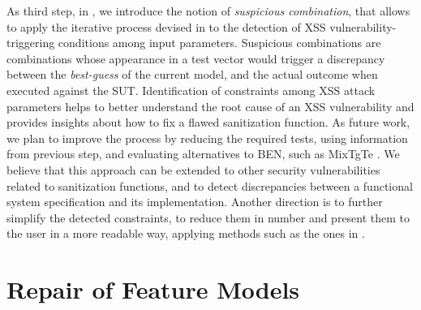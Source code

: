 \begin{tikzborder}{\cite{Gargantini16:validation}}
\begin{tikzborder}{\cite{gargantini_combinatorial_2017}}
\begin{tikzborder}{\cite{gargantini_combinatorial_2017}}
\begin{tikzborder}{\cite{garn2019}}
As third step, in \cite{garn2019}, we introduce the notion of \textit{suspicious combination}, that allows to apply the iterative process devised in \cite{gargantini_combinatorial_2017} to the detection of XSS vulnerability-triggering conditions among input parameters.
Suspicious combinations are combinations whose appearance in a test vector would trigger a discrepancy between the \textit{best-guess} of the current model, and the actual outcome when executed against the SUT.
Identification of constraints among XSS attack parameters helps to better understand
the root cause of an XSS vulnerability and provides insights about how to fix
a flawed sanitization function.
As future work, we plan to improve the process by reducing the required tests, using information from previous step, and evaluating alternatives to BEN, such as MixTgTe \cite{iwct19}. We believe that this approach can be extended to other security vulnerabilities related to sanitization functions, and to detect discrepancies between a functional system specification and its implementation.
Another direction is to further simplify the detected constraints, to reduce them in number and present them to the user in a more readable way, applying methods such as the ones in \cite{arcaini2019varivolution}.





\chapter{Repair of Feature Models}\label{ch:fmrepair}


\end{tikzborder}
\end{tikzborder}
\end{tikzborder}
\end{tikzborder}
